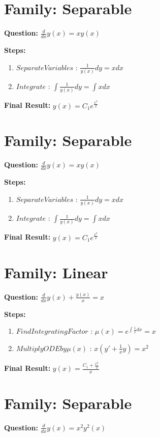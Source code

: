 \documentclass{article}
\begin{document}
\section*{Family: Separable}
\textbf{Question:} $\frac{d}{d x} y{\left(x \right)} = x y{\left(x \right)}$

\textbf{Steps:}
\begin{enumerate}
\item $Separate Variables$ :  $\frac{1}{y{\left(x \right)}} dy = x dx$
\item $Integrate$ :  $\int \frac{1}{y{\left(x \right)}} dy = \int x dx$
\end{enumerate}
\textbf{Final Result:} $y{\left(x \right)} = C_{1} e^{\frac{x^{2}}{2}}$

\section*{Family: Separable}
\textbf{Question:} $\frac{d}{d x} y{\left(x \right)} = x y{\left(x \right)}$

\textbf{Steps:}
\begin{enumerate}
\item $Separate Variables$ :  $\frac{1}{y{\left(x \right)}} dy = x dx$
\item $Integrate$ :  $\int \frac{1}{y{\left(x \right)}} dy = \int x dx$
\end{enumerate}
\textbf{Final Result:} $y{\left(x \right)} = C_{1} e^{\frac{x^{2}}{2}}$

\section*{Family: Linear}
\textbf{Question:} $\frac{d}{d x} y{\left(x \right)} + \frac{y{\left(x \right)}}{x} = x$

\textbf{Steps:}
\begin{enumerate}
\item $Find Integrating Factor$ :  $\mu(x) = e^{\int \frac{1}{x} dx} = x$
\item $Multiply ODE by \mu(x)$ :  $x(y' + \frac{1}{x}y) = x^{2}$
\end{enumerate}
\textbf{Final Result:} $y{\left(x \right)} = \frac{C_{1} + \frac{x^{3}}{3}}{x}$

\section*{Family: Separable}
\textbf{Question:} $\frac{d}{d x} y{\left(x \right)} = x^{2} y^{2}{\left(x \right)}$
\end{document}
